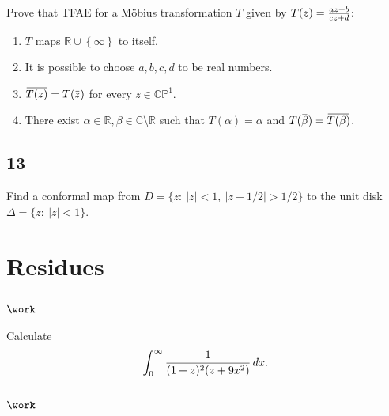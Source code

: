 Prove that TFAE for a Möbius transformation \(T\) given by
\(T(z) = {az + b \over cz + d}\):

\begin{enumerate}
\def\labelenumi{\alph{enumi}.}
\tightlist
\item
  \(T\) maps \({\mathbb{R}}\cup\left\{{\infty}\right\}\) to itself.
\item
  It is possible to choose \(a,b,c,d\) to be real numbers.
\item
  \(\mkern 1.5mu\overline{\mkern-1.5muT(z)\mkern-1.5mu}\mkern 1.5mu = T(\mkern 1.5mu\overline{\mkern-1.5muz\mkern-1.5mu}\mkern 1.5mu)\)
  for every \(z\in {\mathbb{CP}}^1\).
\item
  There exist
  \(\alpha\in {\mathbb{R}}, \beta \in {\mathbb{C}}\setminus {\mathbb{R}}\)
  such that \(T(\alpha) = \alpha\) and
  \(T(\mkern 1.5mu\overline{\mkern-1.5mu\beta\mkern-1.5mu}\mkern 1.5mu) = \mkern 1.5mu\overline{\mkern-1.5muT(\beta)\mkern-1.5mu}\mkern 1.5mu\).
\end{enumerate}

\hypertarget{section-9}{%
\subsection{13}\label{section-9}}

Find a conformal map from \(D = \{z :\  |z| < 1,\ |z - 1/2| > 1/2\}\) to
the unit disk \(\Delta=\{z: \ |z|<1\}\).

\hypertarget{residues}{%
\section{Residues}\label{residues}}

\hypertarget{work-48}{%
\subsection{\texorpdfstring{\(\work\)}{\textbackslash work}}\label{work-48}}

\begin{problem}[?]

Calculate
\begin{align*}
\int_0^\infty {1 \over (1+z)^2 (z+9x^2)} \, dx
.\end{align*}

\end{problem}

\hypertarget{work-49}{%
\subsection{\texorpdfstring{\(\work\)}{\textbackslash work}}\label{work-49}}

